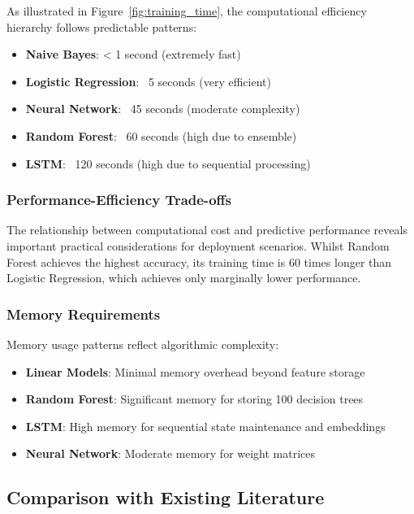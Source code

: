 \documentclass[11pt,a4paper]{article}
\begin{document}
As illustrated in Figure~\ref{fig:training_time}, the computational efficiency hierarchy follows predictable patterns:

\begin{itemize}
    \item \textbf{Naive Bayes}: < 1 second (extremely fast)
    \item \textbf{Logistic Regression}: ~5 seconds (very efficient)
    \item \textbf{Neural Network}: ~45 seconds (moderate complexity)
    \item \textbf{Random Forest}: ~60 seconds (high due to ensemble)
    \item \textbf{LSTM}: ~120 seconds (high due to sequential processing)
\end{itemize}

\subsubsection{Performance-Efficiency Trade-offs}

The relationship between computational cost and predictive performance reveals important practical considerations for deployment scenarios. Whilst Random Forest achieves the highest accuracy, its training time is 60 times longer than Logistic Regression, which achieves only marginally lower performance.

\subsubsection{Memory Requirements}

Memory usage patterns reflect algorithmic complexity:

\begin{itemize}
    \item \textbf{Linear Models}: Minimal memory overhead beyond feature storage
    \item \textbf{Random Forest}: Significant memory for storing 100 decision trees
    \item \textbf{LSTM}: High memory for sequential state maintenance and embeddings
    \item \textbf{Neural Network}: Moderate memory for weight matrices
\end{itemize}

\subsection{Comparison with Existing Literature}
\end{document}
